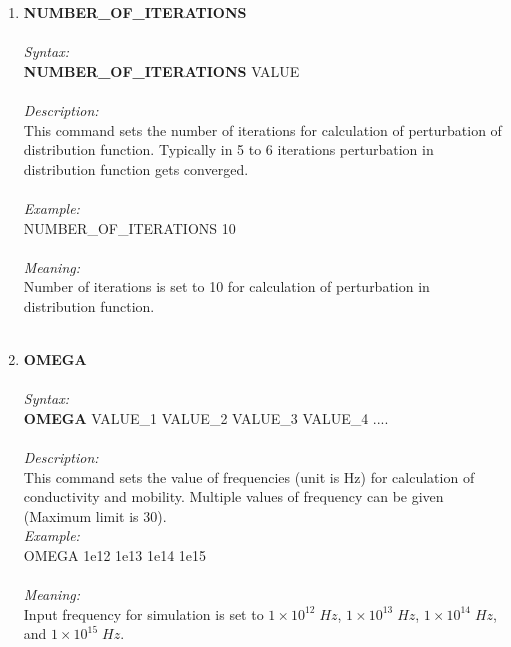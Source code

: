 \documentclass[12pt]{article}
\begin{document}
\begin{enumerate}
    \item \textbf{NUMBER\_OF\_ITERATIONS }     \\ \\
    \textit{Syntax:} \\
    \textbf{NUMBER\_OF\_ITERATIONS} VALUE \\ \\
    \textit{Description:} \\
    This command sets the number of iterations for calculation of perturbation of distribution function. Typically in 5 to 6 iterations perturbation in distribution function gets converged. \\ \\
    \textit{Example:} \\
    NUMBER\_OF\_ITERATIONS 10 \\ \\
    \textit{Meaning:} \\    
    Number of iterations is set to 10 for calculation of perturbation in distribution function. \\ \\
    
    \item \textbf{OMEGA}   \\ \\
    \textit{Syntax:} \\
    \textbf{OMEGA} VALUE\_1 VALUE\_2 VALUE\_3 VALUE\_4 .... \\ \\
    \textit{Description:} \\
    This command sets the value of frequencies (unit is Hz) for calculation of conductivity and mobility. Multiple values of frequency can be given (Maximum limit is 30). \\
    \textit{Example:} \\
    OMEGA 1e12 1e13 1e14 1e15 \\ \\
    \textit{Meaning:} \\    
    Input frequency for simulation is set to $1 \times 10^{12} \; Hz$, $1 \times 10^{13} \; Hz$, $1 \times 10^{14} \; Hz$, and $1 \times 10^{15} \; Hz$. \\ \\



\end{enumerate}
\end{document}
